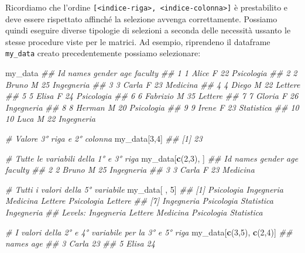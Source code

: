 \documentclass[
]{book}
\newenvironment{Shaded}{\begin{snugshade}}{\end{snugshade}}
\newcommand{\CommentTok}[1]{\textcolor[rgb]{0.56,0.35,0.01}{\textit{#1}}}
\newcommand{\DecValTok}[1]{\textcolor[rgb]{0.00,0.00,0.81}{#1}}
\newcommand{\KeywordTok}[1]{\textcolor[rgb]{0.13,0.29,0.53}{\textbf{#1}}}
\newcommand{\NormalTok}[1]{#1}
\begin{document}
Ricordiamo che l'ordine \texttt{{[}\textless{}indice-riga\textgreater{},\ \textless{}indice-colonna\textgreater{}{]}} è prestabilito e deve essere rispettato affinché la selezione avvenga correttamente. Possiamo quindi eseguire diverse tipologie di selezioni a seconda delle necessità ussanto le stesse procedure viste per le matrici. Ad esempio, riprendeno il dataframe \texttt{my\_data} creato precedentemente possiamo selezionare:

\begin{Shaded}
\begin{Highlighting}[]
\NormalTok{my_data}
\CommentTok{##    Id    names gender age    faculty}
\CommentTok{## 1   1    Alice      F  22 Psicologia}
\CommentTok{## 2   2    Bruno      M  25 Ingegneria}
\CommentTok{## 3   3    Carla      F  23   Medicina}
\CommentTok{## 4   4    Diego      M  22    Lettere}
\CommentTok{## 5   5    Elisa      F  24 Psicologia}
\CommentTok{## 6   6 Fabrizio      M  35    Lettere}
\CommentTok{## 7   7   Gloria      F  26 Ingegneria}
\CommentTok{## 8   8   Herman      M  20 Psicologia}
\CommentTok{## 9   9    Irene      F  23 Statistica}
\CommentTok{## 10 10     Luca      M  22 Ingegneria}

\CommentTok{# Valore 3° riga e 2° colonna}
\NormalTok{my_data[}\DecValTok{3}\NormalTok{,}\DecValTok{4}\NormalTok{]}
\CommentTok{## [1] 23}

\CommentTok{# Tutte le variabili della 1° e 3° riga}
\NormalTok{my_data[}\KeywordTok{c}\NormalTok{(}\DecValTok{2}\NormalTok{,}\DecValTok{3}\NormalTok{), ]}
\CommentTok{##   Id names gender age    faculty}
\CommentTok{## 2  2 Bruno      M  25 Ingegneria}
\CommentTok{## 3  3 Carla      F  23   Medicina}

\CommentTok{# Tutti i valori della 5° variabile}
\NormalTok{my_data[ , }\DecValTok{5}\NormalTok{]}
\CommentTok{##  [1] Psicologia Ingegneria Medicina   Lettere    Psicologia Lettere   }
\CommentTok{##  [7] Ingegneria Psicologia Statistica Ingegneria}
\CommentTok{## Levels: Ingegneria Lettere Medicina Psicologia Statistica}

\CommentTok{# I valori della 2° e 4° variabile per la 3° e 5° riga}
\NormalTok{my_data[}\KeywordTok{c}\NormalTok{(}\DecValTok{3}\NormalTok{,}\DecValTok{5}\NormalTok{), }\KeywordTok{c}\NormalTok{(}\DecValTok{2}\NormalTok{,}\DecValTok{4}\NormalTok{)]}
\CommentTok{##   names age}
\CommentTok{## 3 Carla  23}
\CommentTok{## 5 Elisa  24}
\end{Highlighting}
\end{Shaded}
\end{document}
